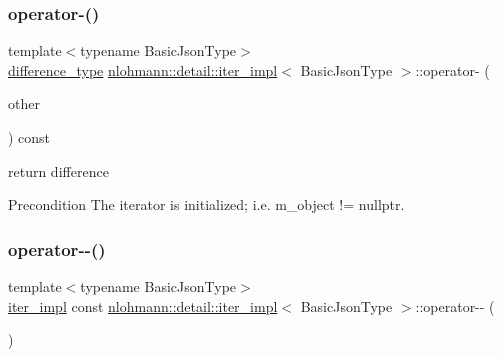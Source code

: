 \subsubsection{\texorpdfstring{operator-\/()}{operator-()}\hspace{0.1cm}{\footnotesize\ttfamily [2/2]}}
{\footnotesize\ttfamily template$<$typename Basic\+Json\+Type$>$ \\
\hyperlink{classnlohmann_1_1detail_1_1iter__impl_a2f7ea9f7022850809c60fc3263775840}{difference\+\_\+type} \hyperlink{classnlohmann_1_1detail_1_1iter__impl}{nlohmann\+::detail\+::iter\+\_\+impl}$<$ Basic\+Json\+Type $>$\+::operator-\/ (\begin{DoxyParamCaption}\item[{const \hyperlink{classnlohmann_1_1detail_1_1iter__impl}{iter\+\_\+impl}$<$ Basic\+Json\+Type $>$ \&}]{other }\end{DoxyParamCaption}) const\hspace{0.3cm}{\ttfamily [inline]}}



return difference 

\begin{DoxyPrecond}{Precondition}
The iterator is initialized; i.\+e. {\ttfamily m\+\_\+object != nullptr}. 
\end{DoxyPrecond}
\mbox{\label{classnlohmann_1_1detail_1_1iter__impl_a1fc43e764467b8ea4a4cdd01f629d757}} 
\subsubsection{\texorpdfstring{operator-\/-\/()}{operator--()}\hspace{0.1cm}{\footnotesize\ttfamily [1/2]}}
{\footnotesize\ttfamily template$<$typename Basic\+Json\+Type$>$ \\
\hyperlink{classnlohmann_1_1detail_1_1iter__impl}{iter\+\_\+impl} const \hyperlink{classnlohmann_1_1detail_1_1iter__impl}{nlohmann\+::detail\+::iter\+\_\+impl}$<$ Basic\+Json\+Type $>$\+::operator-\/-\/ (\begin{DoxyParamCaption}\item[{int}]{ }\end{DoxyParamCaption})\hspace{0.3cm}{\ttfamily [inline]}}




